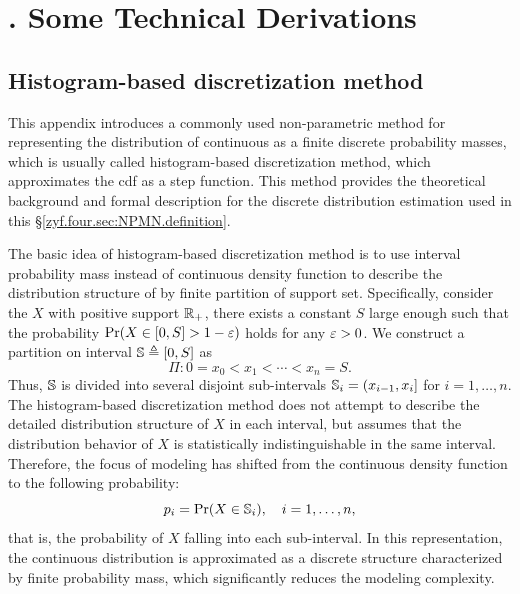 \section{$\!\!\!\!\!\!\!$. Some Technical Derivations}      %

\subsection{Histogram-based discretization method}\label{zyf.four.sec:discretization}     %

This appendix introduces a commonly used non-parametric method for representing the distribution of continuous \trv as a finite discrete probability masses, which is usually called histogram-based discretization method, which approximates the cdf as a step function. This method provides the theoretical background and formal description for the discrete distribution estimation used in this \S\ref{zyf.four.sec:NPMN.definition}.

The basic idea of histogram-based discretization method is to use interval probability mass instead of continuous density function to describe the distribution structure of \trv by finite partition of support set. Specifically, consider the \trv $X$ with positive support ${\mathbb{R}}_+$, there exists a constant $S$ large enough such that the probability $\Pr(X \in [0, S] > 1 - \varepsilon)$ holds for any $\varepsilon > 0$. We construct a partition on interval ${\mathbb{S}} \triangleq[0, S]$ as
$$
    \Pi: 0 = x_0 < x_1 < \cdots < x_n = S.
$$
Thus, ${\mathbb{S}}$ is divided into several disjoint sub-intervals ${\mathbb{S}}_i = (x_{i-1}, x_i]$ for $i = 1, \dots, n$. The histogram-based discretization method does not attempt to describe the detailed distribution structure of $X$ in each interval, but assumes that the distribution behavior of $X$ is statistically indistinguishable in the same interval. Therefore, the focus of modeling has shifted from the continuous density function to the following probability:
$$
    p_i = \Pr(X \in {\mathbb{S}}_i), \quad i = 1, \dots, n,
$$
that is, the probability of $X$ falling into each sub-interval. In this representation, the continuous distribution is approximated as a discrete structure characterized by finite probability mass, which significantly reduces the modeling complexity.

